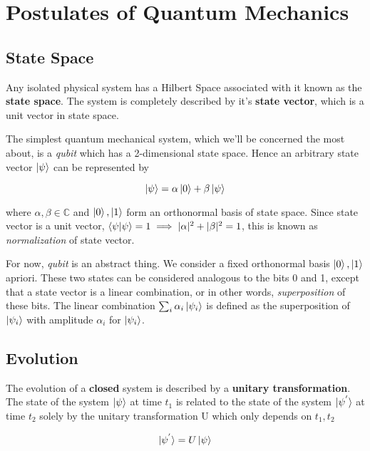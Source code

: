 \chapter{Postulates of Quantum Mechanics}

\section{State Space}

\begin{postulate}
    Any isolated physical system has a Hilbert Space associated with it known as the \textbf{state space}. The system is completely described by it's \textbf{state vector}, which is a unit vector in state space.
\end{postulate}

The simplest quantum mechanical system, which we'll be concerned the most about, is a \textit{qubit} which has a 2-dimensional state space. Hence an arbitrary state vector $\ket{\psi}$ can be represented by

\begin{equation}
    \ket{\psi} = \alpha \ket{0} + \beta \ket{\psi}
\end{equation}

where $\alpha, \beta \in \mathbb{C}$ and $\ket{0}, \ket{1}$ form an orthonormal basis of state space. Since state vector is a unit vector, $\braket{\psi|\psi} = 1 \implies |\alpha|^2 + |\beta|^2 = 1$, this is known as \textit{normalization} of state vector.

For now, \textit{qubit} is an abstract thing. We consider a fixed orthonormal basis $\ket{0}, \ket{1}$ apriori. These two states can be considered analogous to the bits 0 and 1, except that a state vector is a linear combination, or in other words, \textit{superposition } of these bits. The linear combination $\sum_i \alpha_i \ket{\psi_i}$ is defined as the superposition of $\ket{\psi_i}$ with amplitude $\alpha_i$ for $\ket{\psi_i}$.


\section{Evolution}

\begin{postulate}
    The evolution of a \textbf{closed} system is described by a \textbf{unitary transformation}. The state of the system $\ket{\psi}$ at time $t_1$ is related to the state of the system $\ket{\psi^{'}}$ at time $t_2$ solely by the unitary transformation U which only depends on $t_1, t_2$

    \begin{equation}
        \ket{\psi^{'}} = U\ket{\psi}
    \end{equation}
    \label{postulate_2}
\end{postulate}

